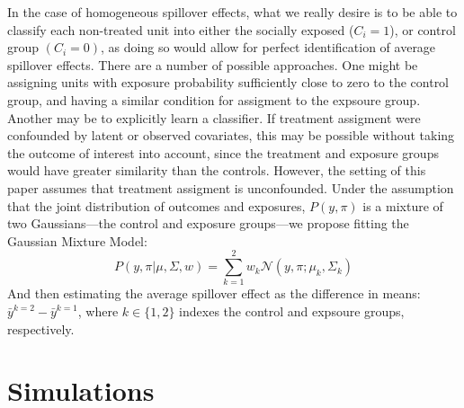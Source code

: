 \documentclass{article}
\begin{document}
In the case of homogeneous spillover effects, what we really desire is to be able to classify each non-treated unit into either the socially exposed ($C_i = 1$), or control group $(C_i = 0)$, as doing so 
would allow for perfect identification of average spillover effects. There are a number of possible approaches. One might be assigning units with exposure probability sufficiently close to zero to the control group, 
and having a similar condition for assigment to the expsoure group. Another may be to explicitly learn a classifier. If treatment assigment were confounded by latent or observed covariates, this may be possible without 
taking the outcome of interest into account, since the treatment and exposure groups would have greater similarity than the controls. However, the setting of this paper assumes that treatment assigment is unconfounded. Under 
the assumption that the joint distribution of outcomes and exposures, $P(y, \pi)$ is a mixture of two Gaussians—the control and exposure groups—we propose fitting the Gaussian Mixture Model: \begin{equation}
  P(y, \pi | \mu, \Sigma, w) = \sum_{k = 1}^{2}w_k \mathcal{N}(y, \pi ; \mu_k, \Sigma_k)
\end{equation} 
And then estimating the average spillover effect as the difference in means: $\bar{y}^{k = 2} - \bar{y}^{k = 1}$, where $k \in \{1, 2\}$ indexes the control and expsoure groups, respectively.

\section{Simulations}
\end{document}

